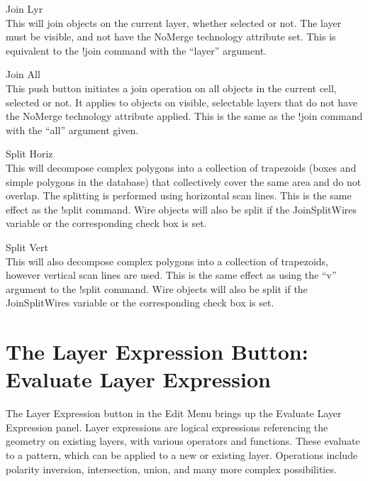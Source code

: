 \begin{description}
\item{\cb Join Lyr}\\
This will join objects on the current layer, whether selected or not. 
The layer must be visible, and not have the {\vt NoMerge} technology
attribute set.  This is equivalent to the {\cb !join} command with the
``layer'' argument.

\item{\cb Join All}\\
This push button initiates a join operation on all objects in the
current cell, selected or not.  It applies to objects on visible,
selectable layers that do not have the {\vt NoMerge} technology
attribute applied.  This is the same as the {\cb !join} command with
the ``all'' argument given.

\item{\cb Split Horiz}\\
This will decompose complex polygons into a collection of trapezoids
(boxes and simple polygons in the database) that collectively cover
the same area and do not overlap.  The splitting is performed using
horizontal scan lines.  This is the same effect as the {\cb !split}
command.  Wire objects will also be split if the {\et JoinSplitWires}
variable or the corresponding check box is set.

\item{\cb Split Vert}\\
This will also decompose complex polygons into a collection of
trapezoids, however vertical scan lines are used.  This is the same
effect as using the ``{\vt v}'' argument to the {\cb !split} command. 
Wire objects will also be split if the {\et JoinSplitWires} variable
or the corresponding check box is set.
\end{description}


\section{The {\cb Layer Expression} Button: Evaluate Layer Expression}
The {\cb Layer Expression} button in the {\cb Edit Menu} brings up the
{\cb Evaluate Layer Expression} panel.  Layer expressions are logical
expressions referencing the geometry on existing layers, with various
operators and functions.  These evaluate to a pattern, which can be
applied to a new or existing layer.  Operations include polarity
inversion, intersection, union, and many more complex possibilities.

